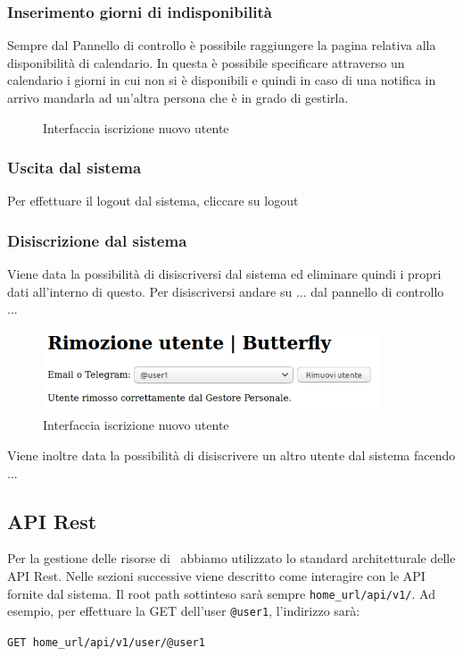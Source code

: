 \subsubsection{Inserimento giorni di indisponibilità}\label{indisponibilita}
Sempre dal Pannello di controllo è possibile raggiungere la pagina relativa alla disponibilità di calendario.
In questa è possibile specificare attraverso un calendario i giorni in cui non si è disponibili e quindi in caso di una notifica in arrivo mandarla ad un'altra persona che è in grado di gestirla.
\begin{figure}[H]
	\centering
	\caption{Interfaccia iscrizione nuovo utente}
\end{figure}

\subsubsection{Uscita dal sistema}
Per effettuare il logout dal sistema, cliccare su logout

\subsubsection{Disiscrizione dal sistema}
Viene data la possibilità di disiscriversi dal sistema ed eliminare quindi i propri dati all'interno di questo.
Per disiscriversi andare su ... dal pannello di controllo ...
\begin{figure}[H]
	\centering
	\includegraphics[width=10cm]{img/rimozione_1.png} %
	\caption{Interfaccia iscrizione nuovo utente}
\end{figure}
Viene inoltre data la possibilità di disiscrivere un altro utente dal sistema facendo ...


\subsection{API Rest}\label{APIRest}
\newcommand{\homeUrl}{home\_url}

Per la gestione delle risorse di \progetto\ abbiamo utilizzato lo standard architetturale delle API Rest.
Nelle sezioni successive viene descritto come interagire con le API fornite dal sistema.
Il root path sottinteso sarà sempre \texttt{\homeUrl/api/v1/}.
Ad esempio, per effettuare la GET dell'user \texttt{@user1}, l'indirizzo sarà:
\begin{center}
    \texttt{GET \homeUrl/api/v1/user/@user1}
\end{center}

